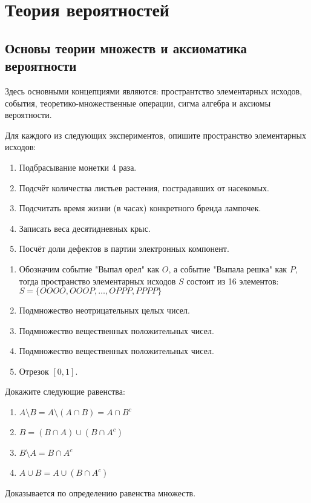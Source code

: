 \documentclass[document]{subfiles}
\begin{document}
\chapter{Теория вероятностей}

\section{Основы теории множеств и аксиоматика вероятности}

Здесь основными концепциями являются: пространтство элементарных исходов, события, теоретико-множественные операции, сигма алгебра и аксиомы вероятности.

\begin{problem}
    Для каждого из следующих экспериментов, опишите пространство элементарных исходов:
    \begin{enumerate}
        \item Подбрасывание монетки 4 раза.
        \item Подсчёт количества листьев растения, пострадавших от насекомых.
        \item Подсчитать время жизни (в часах) конкретного бренда лампочек.
        \item Записать веса десятидневных крыс.
        \item Посчёт доли дефектов в партии электронных компонент.
    \end{enumerate}
\end{problem}
\begin{solution}
    \begin{enumerate}
        \item Обозначим событие "Выпал орел" как $O$, а событие "Выпала решка" как $P$, тогда пространство элементарных исходов $S$ состоит из 16 элементов: $S = \{OOOO, OOOP, \dots, OPPP, PPPP\}$
        \item Подмножество неотрицательных целых чисел.
        \item Подмножество вещественных положительных чисел.
        \item Подмножество вещественных положительных чисел.
        \item Отрезок $[0,1]$.
    \end{enumerate}
\end{solution}

\begin{problem}
    Докажите следующие равенства:
    \begin{enumerate}
        \item $A \setminus B = A \setminus (A \cap B) = A \cap B^c$
        \item $B = (B \cap A) \cup (B \cap A^c)$
        \item $B \setminus A = B \cap A^c$
        \item $A \cup B = A \cup (B \cap A^c)$
    \end{enumerate}
\end{problem}
\begin{solution}
    Доказывается по определению равенства множеств.
\end{solution}
\end{document}
